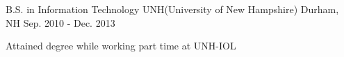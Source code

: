 

\begin{cventries}

  \cventry
    {B.S. in Information Technology} %
    {UNH(University of New Hampshire)} %
    {Durham, NH} %
    {Sep. 2010 - Dec. 2013} %
    {
      \begin{cvitems} %
        \item {Attained degree while working part time at UNH-IOL}
      \end{cvitems}
    }

\end{cventries}
